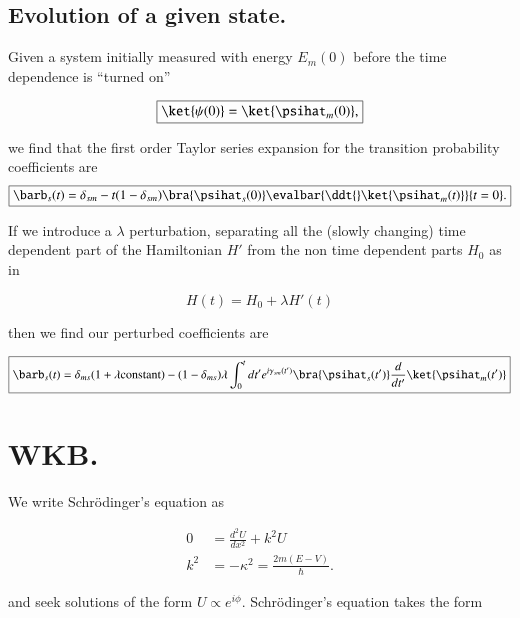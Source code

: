 \subsection{Evolution of a given state.}

Given a system initially measured with energy $E_m(0)$ before the time dependence is ``turned on''

\begin{equation}\label{eqn:qmTwoReview:650}
\boxed{
\ket{\psi(0)} = \ket{\psihat_m(0)},
}
\end{equation}

we find that the first order Taylor series expansion for the transition probability coefficients are
\begin{equation}\label{eqn:qmTwoReview:890}
\boxed{
\barb_s(t) = \delta_{sm} - t (1 - \delta_{sm}) \bra{\psihat_s(0)} \evalbar{\ddt{} \ket{\psihat_m(t)}}{t=0}.
}
\end{equation}

If we introduce a $\lambda$ perturbation, separating all the (slowly changing) time dependent part of the Hamiltonian $H'$ from the non time dependent parts $H_0$ as in

\begin{equation}\label{eqn:qmTwoReview:910}
H(t) = H_0 + \lambda H'(t)
\end{equation}

then we find our perturbed coefficients are

\begin{equation}\label{eqn:qmTwoReview:930}
\boxed{
\barb_s(t) 
=
\delta_{ms}(1 + \lambda \text{constant})
- 
(1-\delta_{ms}) \lambda
\int_0^t dt'
e^{i \gamma_{sm}(t') } \bra{\psihat_s(t')} \frac{d}{dt'} \ket{\psihat_m(t')} 
}
\end{equation}

\section{WKB.}

We write Schr\"{o}dinger's equation as

\begin{equation}\label{eqn:qmTwoReview:670}
\boxed{
\begin{aligned}
0 &= \frac{d^2 U}{dx^2} + k^2 U \\
k^2 &= -\kappa^2 = \frac{2m (E - V)}{\hbar}.
\end{aligned}
}
\end{equation}

and seek solutions of the form $U \propto e^{i\phi}$.  Schr\"{o}dinger's equation takes the form

